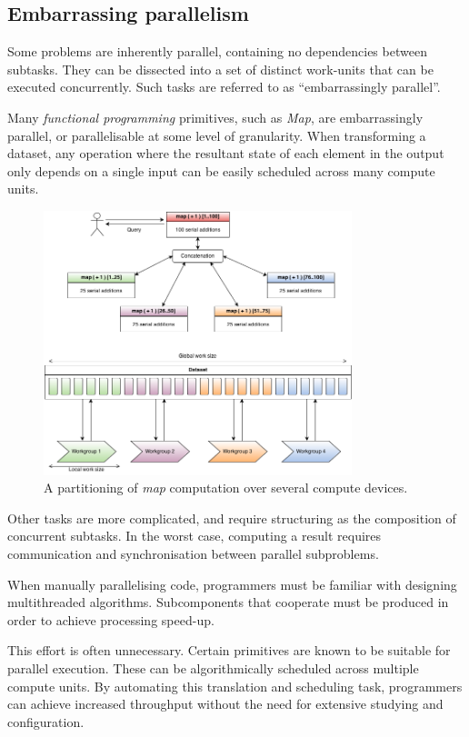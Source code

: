 \subsection{Embarrassing parallelism}
Some problems are inherently parallel, containing no dependencies between subtasks. They can be dissected into a set of distinct work-units that can be executed concurrently.
Such tasks are referred to as ``embarrassingly parallel''.

Many \emph{functional programming} primitives, such as \emph{Map}, are embarrassingly parallel, or parallelisable at some level of granularity.
When transforming a dataset, any operation where the resultant state of each element in the output only depends on a single input can be easily scheduled across many compute units.

\begin{figure}[h]
  \includegraphics[width=0.8\textwidth]{./figures/map_task.png}
  \caption{A partitioning of \emph{map} computation over several compute devices.}
  \label{fig:map_task}
\end{figure}

Other tasks are more complicated, and require structuring as the composition of concurrent subtasks.
In the worst case, computing a result requires communication and synchronisation between parallel subproblems.

When manually parallelising code, programmers must be familiar with designing multithreaded algorithms. Subcomponents that cooperate must be produced in order to achieve processing speed-up.

This effort is often unnecessary. Certain primitives are known to be suitable for parallel execution. These can be algorithmically scheduled across multiple compute units. By automating this translation and scheduling task, programmers can achieve increased throughput without the need for extensive studying and configuration.

